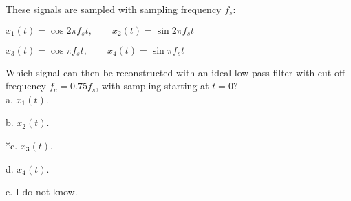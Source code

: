 
These signals are sampled with sampling frequency $f_{s}$:

$x_{1}\left( t \right) = \cos 2\pi f_{s}t, \qquad x_{2}\left( t \right) = \sin 2\pi f_{s}t$

$ x_{3}\left( t \right) = \cos\pi f_{s}t, \qquad x_{4}\left( t \right) = \sin\pi f_{s}t$

Which signal can then be reconstructed with an ideal low-pass filter with cut-off frequency $f_{c} = 0.75f_{s}$, with sampling starting at $t = 0$? \\

a. $x_{1}(t)$.


b. $x_{2}(t)$.


*c. $x_{3}(t)$.


d. $x_{4}(t)$.


e. I do not know. \\

